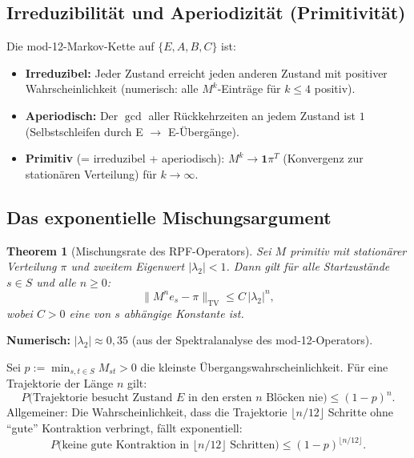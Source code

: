 \documentclass[12pt,a4paper]{article}
\newtheorem{theorem}[definition]{Theorem}
\newcommand{\TV}{\mathrm{TV}}
\begin{document}
\subsection{Irreduzibilität und Aperiodizität (Primitivität)}

\begin{tcolorbox}[rpf, title={Primitivität des Transfer-Operators (numerisch belegt)}]
Die mod-12-Markov-Kette auf $\{E, A, B, C\}$ ist:
\begin{itemize}[nosep]
  \item \textbf{Irreduzibel:} Jeder Zustand erreicht jeden anderen Zustand
    mit positiver Wahrscheinlichkeit (numerisch: alle $M^k$-Einträge
    für $k \leq 4$ positiv).
  \item \textbf{Aperiodisch:} Der $\gcd$ aller Rückkehrzeiten an jedem
    Zustand ist $1$ (Selbstschleifen durch E $\to$ E-Übergänge).
  \item \textbf{Primitiv} (= irreduzibel + aperiodisch): $M^k \to \mathbf{1}\pi^T$
    (Konvergenz zur stationären Verteilung) für $k \to \infty$.
\end{itemize}
\end{tcolorbox}

\subsection{Das exponentielle Mischungsargument}

\begin{theorem}[Mischungsrate des RPF-Operators]
\label{thm:mischung}
Sei $M$ primitiv mit stationärer Verteilung $\pi$ und zweitem Eigenwert
$|\lambda_2| < 1$. Dann gilt für alle Startzustände $s \in S$ und
alle $n \geq 0$:
\[
  \bigl\|M^n e_s - \pi\bigr\|_{\TV} \leq C\,|\lambda_2|^n,
\]
wobei $C > 0$ eine von $s$ abhängige Konstante ist.
\end{theorem}

\textbf{Numerisch:} $|\lambda_2| \approx 0{,}35$ (aus der Spektralanalyse
des mod-12-Operators).

\begin{tcolorbox}[ergebnis, title={Schlüsseleigenschaft: Mindestbesuchswahrscheinlichkeit}]
Sei $p := \min_{s,t \in S} M_{st} > 0$ die kleinste Übergangswahrscheinlichkeit.
Für eine Trajektorie der Länge $n$ gilt:
\[
  P\bigl(\text{Trajektorie besucht Zustand } E \text{ in den ersten }
  n \text{ Blöcken nie}\bigr) \leq (1-p)^n.
\]
Allgemeiner: Die Wahrscheinlichkeit, dass die Trajektorie $\lfloor n/12 \rfloor$
Schritte ohne ``gute'' Kontraktion verbringt, fällt exponentiell:
\[
  P\bigl(\text{keine gute Kontraktion in } \lfloor n/12 \rfloor \text{ Schritten}\bigr)
  \leq (1-p)^{\lfloor n/12 \rfloor}.
\]
\end{tcolorbox}
\end{document}
